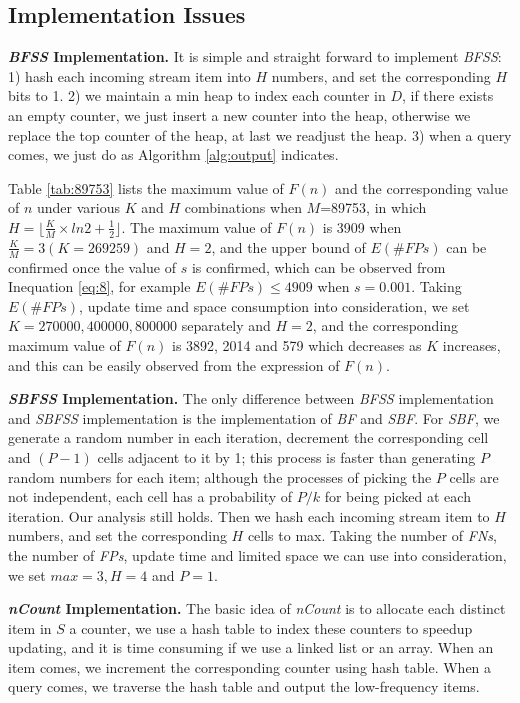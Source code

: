 \documentclass[conference]{IEEEtran}
\begin{document}
\subsection{Implementation Issues}
\textbf{\emph{BFSS} Implementation.} It is simple and straight forward to implement \emph{BFSS}: 1) hash each incoming stream item into $H$ numbers, and set the corresponding $H$ bits to 1. 2) we maintain a min heap to index each counter in $D$, if there exists an empty counter, we just insert a new counter into the heap, otherwise we replace the top counter of the heap, at last we readjust the heap. 3) when a query comes, we just do as Algorithm \ref{alg:output} indicates.\par
Table \ref{tab:89753} lists the maximum value of $F(n)$ and the corresponding value of $n$ under various $K$ and $H$ combinations when $M$=89753, in which $H=\lfloor\frac{K}{M}\times ln2+\frac{1}{2}\rfloor$. The maximum value of $F(n)$ is 3909 when $\frac{K}{M}=3(K=269259)$ and $H=2$, and the upper bound of $E(\#FPs)$ can be confirmed once the value of $s$ is confirmed, which can be observed from Inequation \ref{eq:8}, for example $E(\#FPs)\leq 4909$ when $s=0.001$. Taking $E(\#FPs)$, update time and space consumption into consideration, we set $K=270000,400000,800000$ separately and $H=2$, and the corresponding maximum value of $F(n)$ is 3892, 2014 and 579 which decreases as $K$ increases, and this can be easily observed from the expression of $F(n)$.\par
\textbf{\emph{SBFSS} Implementation.} The only difference between \emph{BFSS} implementation and \emph{SBFSS} implementation is the implementation of \emph{BF} and \emph{SBF}. For \emph{SBF}, we generate a random number in each iteration, decrement the corresponding cell and $(P-1)$ cells adjacent to it by 1; this process is faster than generating $P$ random numbers for each item; although the processes of picking the $P$ cells are not independent, each cell has a probability of $P/k$ for being picked at each iteration. Our analysis still holds. Then we hash each incoming stream item to $H$ numbers, and set the corresponding $H$ cells to max. Taking the number of \emph{FNs}, the number of \emph{FPs}, update time and limited space we can use into consideration, we set $max=3, H=4$ and $P=1$.\par

\textbf{\emph{nCount} Implementation.} The basic idea of \emph{nCount} is to allocate each distinct item in $S$ a counter, we use a hash table to index these counters to speedup updating, and it is time consuming if we use a linked list or an array. When an item comes, we increment the corresponding counter using hash table. When a query comes, we traverse the hash table and output the low-frequency items. \par
\end{document}

